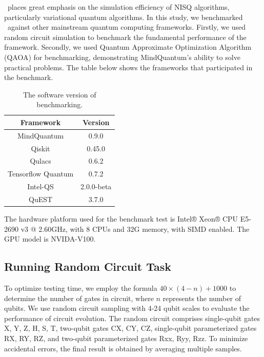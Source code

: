 \MindQuantum\ places great emphasis on the simulation efficiency of NISQ algorithms, particularly variational quantum algorithms. In this study, we benchmarked \MindQuantum\ against other mainstream quantum computing frameworks. Firstly, we used random circuit simulation to benchmark the fundamental performance of the framework. Secondly, we used Quantum Approximate Optimization Algorithm (QAOA) for benchmarking, demonstrating MindQuantum’s ability to solve practical problems. The table below shows the frameworks that participated in the benchmark.

\begin{table}[ht]
    \begin{tabular}{cc}
        \toprule
        Framework           & Version       \\
        \midrule
        MindQuantum         & 0.9.0         \\
        Qiskit              & 0.45.0        \\
        Qulacs              & 0.6.2         \\
        Tensorflow Quantum  & 0.7.2         \\
        Intel-QS            & 2.0.0-beta    \\
        QuEST               & 3.7.0         \\
        \bottomrule
    \end{tabular}
    \caption{The software version of benchmarking.}
    \label{tab:software version}
\end{table}

The hardware platform used for the benchmark test is Intel® Xeon® CPU E5-2690 v3 @ 2.60GHz, with 8 CPUs and 32G memory, with SIMD enabled. The GPU model is NVIDA-V100.

\subsection{Running Random Circuit Task}

To optimize testing time, we employ the formula $40 \times (4-n)+1000$ to determine the number of gates in circuit, where $n$ represents the number of qubits. We use random circuit sampling with 4-24 qubit scales to evaluate the performance of circuit evolution. The random circuit comprises single-qubit gates X, Y, Z, H, S, T, two-qubit gates CX, CY, CZ, single-qubit parameterized gates RX, RY, RZ, and two-qubit parameterized gates Rxx, Ryy, Rzz. To minimize accidental errors, the final result is obtained by averaging multiple samples.

